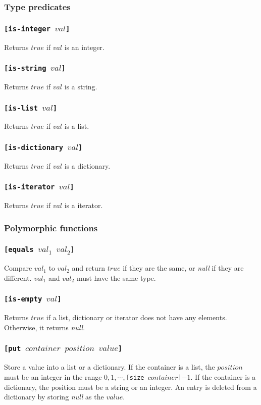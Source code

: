 \documentclass[11pt]{report}
\begin{document}
\subsubsection{Type predicates}
\subsubsection*{\tt{[is-integer }$val$\tt{]}}
Returns $true$ if $val$ is an integer.
\subsubsection*{\tt{[is-string }$val$\tt{]}}
Returns $true$ if $val$ is a string.
\subsubsection*{\tt{[is-list }$val$\tt{]}}
Returns $true$ if $val$ is a list.
\subsubsection*{\tt{[is-dictionary }$val$\tt{]}}
Returns $true$ if $val$ is a dictionary.
\subsubsection*{\tt{[is-iterator }$val$\tt{]}}
Returns $true$ if $val$ is a iterator.

\subsubsection{Polymorphic functions}
\subsubsection*{\tt{[equals }$val_1$ $val_2$\tt{]}}
Compare $val_1$ to $val_2$ and return $true$ if they are the same, or \textit{null} if they are different. $val_1$ and $val_2$ must have the same type.
\subsubsection*{\tt{[is-empty }$val$\tt{]}}
Returns $true$ if a list, dictionary or iterator does not have any elements. Otherwise, it returns \textit{null}.
\subsubsection*{\tt{[put }$container$ $position$ $value$\tt{]}}
Store a value into a list or a dictionary. If the container is a list, the $position$ must be an integer in the range $0,1, \cdots, ${\tt{[size }}$container${\tt{]}}$-1$.
If the container is a dictionary, the position must be a string or an integer. An entry is deleted from a dictionary by storing \textit{null} as the $value$.
\end{document}

